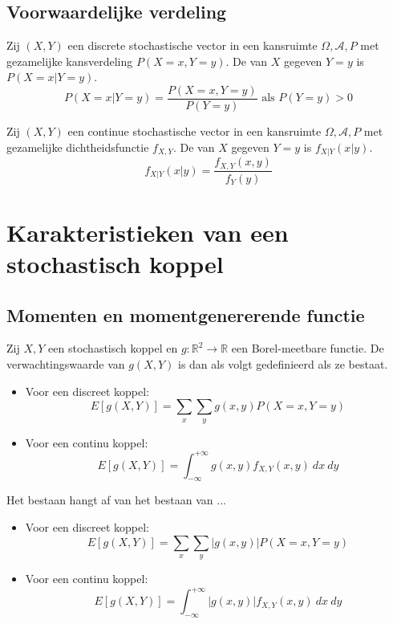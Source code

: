 \documentclass[main.tex]{subfiles}
\begin{document}
\subsection{Voorwaardelijke verdeling}
\label{sec:voorw-verd}

\begin{de}
  Zij $(X,Y)$ een discrete stochastische vector in een kansruimte $\Omega,\mathcal{A},P$ met gezamelijke kansverdeling $P(X=x,Y=y)$.
  De  van $X$ gegeven $Y=y$ is $P(X=x|Y=y)$.
  \[
  P(X=x|Y=y) = \frac{P(X=x,Y=y)}{P(Y=y)} \text{ als } P(Y=y) > 0
  \]
\end{de}

\begin{de}
  Zij $(X,Y)$ een continue stochastische vector in een kansruimte $\Omega,\mathcal{A},P$ met gezamelijke dichtheidsfunctie $f_{X,Y}$.
  De  van $X$ gegeven $Y=y$ is $f_{X|Y}(x|y)$.
  \[
  f_{X|Y}(x|y) = \frac{f_{X,Y}(x,y)}{f_{Y}(y)}
  \]
\end{de}

\section{Karakteristieken van een stochastisch koppel}
\label{sec:karakt-van-een}

\subsection{Momenten en momentgenererende functie}
\label{sec:moment-en-momentg}

\begin{de}
  Zij $X,Y$ een stochastisch koppel en $g: \mathbb{R}^{2} \rightarrow \mathbb{R}$ een Borel-meetbare functie.
  De verwachtingswaarde van $g(X,Y)$ is dan als volgt gedefinieerd als ze bestaat.
  \begin{itemize}
  \item  Voor een discreet koppel:
    \[ E[g(X,Y)] = \sum_{x}\sum_{y}g(x,y)P(X=x,Y=y) \]
  \item Voor een continu koppel:
    \[ E[g(X,Y)] = \int_{-\infty}^{+\infty}g(x,y)f_{X,Y}(x,y)\ dx\ dy \]
  \end{itemize}
\end{de}

\begin{opm}
  Het bestaan hangt af van het bestaan van ... 
  \begin{itemize}
  \item  Voor een discreet koppel:
    \[ E[g(X,Y)] = \sum_{x}\sum_{y}|g(x,y)|P(X=x,Y=y) \]
  \item Voor een continu koppel:
    \[ E[g(X,Y)] = \int_{-\infty}^{+\infty}|g(x,y)|f_{X,Y}(x,y)\ dx\ dy \]
  \end{itemize}
\end{opm}
\end{document}
